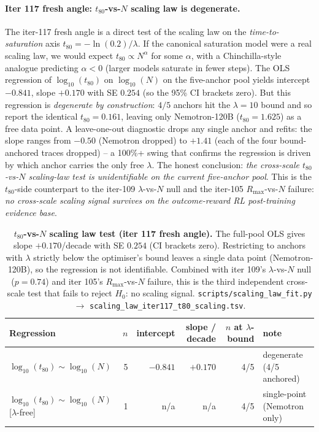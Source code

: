 \documentclass{article}
\begin{document}
\paragraph{Iter 117 fresh angle: $t_{80}$-vs-$N$ scaling law is degenerate.}
\label{par:scaling-iter117-t80}
The iter-117 fresh angle is a direct test of the scaling law on the
\emph{time-to-saturation} axis $t_{80}=-\ln(0.2)/\lambda$.  If the
canonical saturation model were a real scaling law, we would expect
$t_{80} \propto N^{\alpha}$ for some $\alpha$, with a Chinchilla-style
analogue predicting $\alpha < 0$ (larger models saturate in fewer
steps).  The OLS regression of $\log_{10}(t_{80})$ on $\log_{10}(N)$
on the five-anchor pool yields intercept $-0.841$, slope $+0.170$
with SE $0.254$ (so the 95\% CI brackets zero).  But this regression
is \emph{degenerate by construction}: $4/5$ anchors hit the
$\lambda = 10$ bound and so report the identical $t_{80} = 0.161$,
leaving only Nemotron-120B ($t_{80} = 1.625$) as a free data point.
A leave-one-out diagnostic drops any single anchor and refits: the
slope ranges from $-0.50$ (Nemotron dropped) to $+1.41$ (each of
the four bound-anchored traces dropped) -- a 100\%+ swing that
confirms the regression is driven by which anchor carries the only
free $\lambda$.  The honest conclusion: \emph{the cross-scale
$t_{80}$-vs-$N$ scaling-law test is unidentifiable on the current
five-anchor pool}.  This is the $t_{80}$-side counterpart to the
iter-109 $\lambda$-vs-$N$ null and the iter-105 $R_{\max}$-vs-$N$
failure: \emph{no cross-scale scaling signal survives on the
outcome-reward RL post-training evidence base}.

\begin{table}[t]
  \centering
  \small
  \begin{tabular}{lrrrrl}
    \toprule
    Regression & $n$ & intercept & slope / decade &
                $n$ at $\lambda$-bound & note \\
    \midrule
    $\log_{10}(t_{80}) \sim \log_{10}(N)$              & 5 & $-0.841$ & $+0.170$ & 4/5 & degenerate (4/5 anchored) \\
    $\log_{10}(t_{80}) \sim \log_{10}(N)$ [$\lambda$-free] & 1 & n/a     & n/a       & 4/5 & single-point (Nemotron only) \\
    \bottomrule
  \end{tabular}
  \caption{\textbf{$t_{80}$-vs-$N$ scaling law test (iter 117 fresh
    angle).}  The full-pool OLS gives slope $+0.170$/decade with
    SE $0.254$ (CI brackets zero).  Restricting to anchors with
    $\lambda$ strictly below the optimiser's bound leaves a single
    data point (Nemotron-120B), so the regression is not
    identifiable.  Combined with iter 109's $\lambda$-vs-$N$ null
    ($p = 0.74$) and iter 105's $R_{\max}$-vs-$N$ failure, this is
    the third independent cross-scale test that fails to reject
    $H_0$: no scaling signal.  \texttt{scripts/scaling\_law\_fit.py}
    $\to$ \texttt{scaling\_law\_iter117\_t80\_scaling.tsv}.}
  \label{tab:scaling-iter117-t80}
\end{table}
\end{document}
